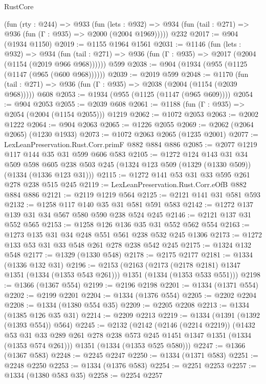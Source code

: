 \begin{lexlean}{RustCore}
\begin{coremodule}
    (fun (rty : @244) =>
    @933
      (fun (lets : @932) =>
      @934 (fun (tail : @271) => @936 (fun (Γ : @935) => @2000 (@2004 @1969)))))
    @232
@2017 := @904 (@1934 @1150)
@2019 := @1155 @1964 @1561
@2031 := @1146
    (fun (lets : @932) =>
    @934 (fun (tail : @271) => @936 (fun (Γ : @935) => @2017 (@2004 (@1154 (@2019 @966 @968))))))
    @599
@2038 := @904 (@1934 (@955 (@1125 (@1147 (@965 (@600 @968))))))
@2039 := @2019 @599
@2048 := @1170
    (fun (tail : @271) => @936 (fun (Γ : @935) => @2038 (@2004 (@1154 (@2039 @968)))))
    @608
@2053 := @1934 (@955 (@1125 (@1147 (@965 @609))))
@2054 := @904 @2053
@2055 := @2039 @608
@2061 := @1188 (fun (Γ : @935) => @2054 (@2004 (@1154 @2055))) @1219
@2062 := @1072 @2053
@2063 := @2002 @1222
@2064 := @904 @2063
@2065 := @1226 @2055
@2069 := @2062 (@2064 @2065) (@1230 @1933)
@2073 := @1072 @2063 @2065 (@1235 @2001)
@2077 := LexLeanPreservation.Rust.Corr.primF @882 @884 @886
@2085 := @2077 @1219 @117 @144 @35 @31 @599 @606 @583
@2105 := @1272
    @124
    @143
    @31
    @34
    @509
    @598
    @605
    @238
    @503
    @245
    (@1324 @123 @509 (@1329 (@1330 @509)) (@1334 (@1336 @123 @31)))
@2115 := @1272 @141 @53 @31 @33 @595 @261 @278 @238 @515 @245
@2119 := LexLeanPreservation.Rust.Corr.eOfB @882 @884 @886
@2121 := @2119 @1219 @564
@2125 := @2121 @141 @31 @581 @593
@2132 := @1258 @117 @140 @35 @31 @581 @591 @583
@2142 := @1272 @137 @139 @31 @34 @567 @580 @590 @238 @524 @245
@2146 := @2121 @137 @31 @552 @565
@2153 := @1258 @126 @136 @35 @31 @552 @562 @554
@2163 := @1273 @135 @31 @34 @248 @551 @561 @238 @532 @245 @1306
@2173 := @1272 @133 @53 @31 @33 @548 @261 @278 @238 @542 @245
@2175 := @1324 @132 @548
@2177 := @1329 (@1330 @548)
@2178 := @2175 @2177
@2181 := @1334 (@1336 @132 @31)
@2196 := @2153
    (@2163
      (@2173 (@2178 @2181) @1347 @1351 (@1334 (@1353 @543 @261)))
      @1351
      (@1334 (@1353 @533 @551)))
@2198 := @1366 (@1367 @554)
@2199 := @2196 @2198
@2201 := @1334 (@1371 @554)
@2202 := @2199 @2201
@2204 := @1334 (@1376 @554)
@2205 := @2202 @2204
@2208 := @1334 (@1380 @554 @35)
@2209 := @2205 @2208
@2213 := @1334 (@1385 @126 @35 @31)
@2214 := @2209 @2213
@2219 := @1334 (@1391 (@1392 (@1393 @554)) @564)
@2245 := @2132
    (@2142
      (@2146 (@2214 @2219))
      (@1432 @53 @31 @33 @289 @261 @278 @238 @573 @245 @1451 @1347 @1351 (@1334 (@1353 @574 @261)))
      @1351
      (@1334 (@1353 @525 @580)))
@2247 := @1366 (@1367 @583)
@2248 := @2245 @2247
@2250 := @1334 (@1371 @583)
@2251 := @2248 @2250
@2253 := @1334 (@1376 @583)
@2254 := @2251 @2253
@2257 := @1334 (@1380 @583 @35)
@2258 := @2254 @2257

\end{coremodule}
\end{lexlean}
